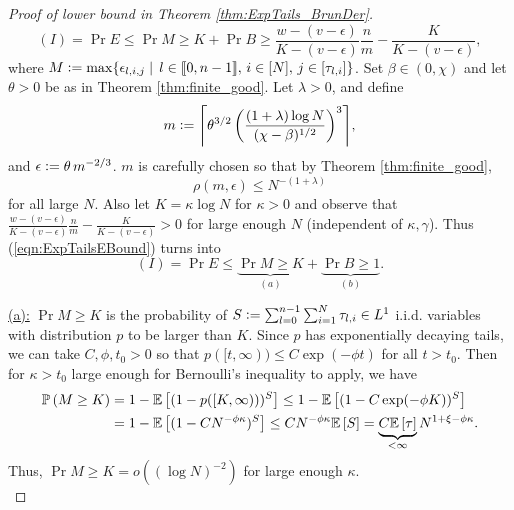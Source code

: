 \begin{proof}[Proof of lower bound in Theorem \ref{thm:ExpTails_BrunDer}]
\begin{equation}\label{eqn:ExpTailsEBound}
(I) = \Pr{E} \leq \Pr{M \geq K} + \Pr{B \geq \frac{w - (v - \epsilon)}{K - (v - \epsilon)}\frac{n}{m} - \frac{K}{K - (v - \epsilon)}},  
\end{equation}
where $M \vcentcolon= \max \{\epsilon_{l, i, j} \mid\, l \in \llbracket0, n - 1\rrbracket,\, i \in [N],\, j \in [\tau_{l, i}] \}$. Set $\beta \in (0, \chi)$ and let $\theta > 0$ be as in Theorem \ref{thm:finite_good}. Let $\lambda > 0$, and define 
\begin{equation}
m \defeq \ceil*{\theta^{3/2}\left( \frac{(1 + \lambda) \log N}{(\chi - \beta)^{1/2}}\right)^3},
\end{equation} 
and $\epsilon \vcentcolon= \theta\, m^{-2/3}$. $m$ is carefully chosen so that by Theorem \ref{thm:finite_good}, 
\begin{equation}\label{eqn:ExpTailsProof}
\rho(m, \epsilon) \leq N^{-(1 + \lambda)} 
\end{equation}
for all large $N$. Also let $K = \kappa \log N$ for $\kappa > 0$ and observe that $\frac{w - (v - \epsilon)}{K - (v - \epsilon)}\frac{n}{m} - \frac{K}{K - (v - \epsilon)} > 0$ for large enough $N$ (independent of $\kappa, \gamma$). Thus (\ref{eqn:ExpTailsEBound}) turns into
\begin{equation}
(I) = \Pr{E} \leq \underbrace{\Pr{M \geq K}}_{(a)} + \underbrace{\Pr{B \geq 1}}_{(b)}. 
\end{equation}

\underline{(a):} $\Pr{M \geq K}$ is the probability of $S \vcentcolon= \sum_{l = 0}^{n-1}\sum_{i=1}^N \tau_{l,i} \in L^1$ i.i.d. variables with distribution $p$ to be larger than $K$. Since $p$ has exponentially decaying tails, we can take $C, \phi, t_0 > 0$ so that $p([t, \infty)) \leq C \exp(- \phi t)$ for all $t > t_0$. Then for $\kappa > t_0$ large enough for Bernoulli's inequality to apply, we have
\begin{align}
\mathbb{P} \left( M \geq K \right) &= 1 - \mathbb{E}\left[ (1 - p([K, \infty)))^{S} \right] \leq 1 - \mathbb{E}\left[ (1 - C \exp(-\phi K))^S \right] \\
			  &= 1 - \mathbb{E}\left[ (1 - C N^{-\phi \kappa})^S \right] \leq C N^{-\phi \kappa} \mathbb{E}\left[ S \right] = \underbrace{C \mathbb{E}\left[ \tau \right]}_{< \infty} N^{1 + \xi - \phi \kappa}. 
\end{align} 
Thus, $\Pr{M \geq K} = o((\log N)^{-2})$ for large enough $\kappa$. \\


\end{proof}
